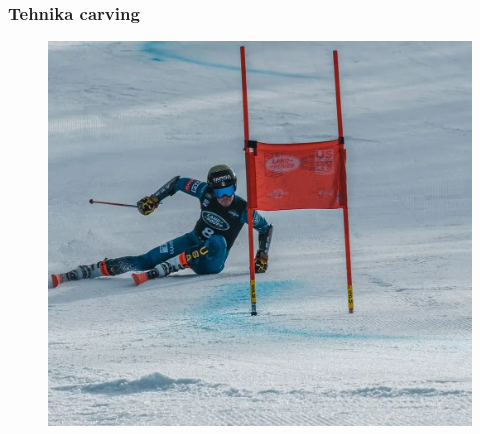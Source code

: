 \documentclass{beamer}
\begin{document}
\begin{frame}
    \frametitle{Tehnika carving}
    
\begin{figure}
    \centering
    \includegraphics[scale=0.2]{../images/River-Radamus-Arcing-a-GS-turn 1.png} \\
\end{figure}

\end{frame}
\end{document}
